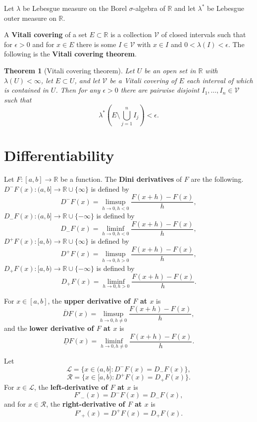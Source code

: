 \documentclass{article}
\newtheorem{theorem}{Theorem}
\theoremstyle{definition}
\begin{document}
Let
$\lambda$ be Lebesgue measure on the Borel $\sigma$-algebra of $\mathbb{R}$ and
let $\lambda^*$ be Lebesgue outer measure on $\mathbb{R}$.

A \textbf{Vitali covering} of a set $E \subset \mathbb{R}$ is a collection $\mathcal{V}$ 
of  closed intervals such that for $\epsilon>0$ and for $x \in E$ there is some $I \in \mathcal{V}$ 
with $x \in I$ and
$0<\lambda(I)<\epsilon$. The following is the \textbf{Vitali covering theorem}.

\begin{theorem}[Vitali covering theorem]
Let $U$ be an open set in $\mathbb{R}$ with $\lambda(U)<\infty$, let
$E \subset U$, and let $\mathcal{V}$ be a Vitali covering of $E$ each interval of which is contained in $U$. Then for any $\epsilon>0$ there
are pairwise disjoint $I_1,\ldots,I_n \in \mathcal{V}$ such that 
\[
\lambda^*\left(E \setminus \bigcup_{j=1}^n I_j \right)< \epsilon.
\]
\end{theorem}









\section{Differentiability}
Let $F:[a,b]  \to \mathbb{R}$ be a function.
The \textbf{Dini derivatives} of $F$ are the following. 
 $D^- F(x):(a,b] \to \mathbb{R} \cup \{\infty\}$ is defined by
\[
D^-F(x) = \limsup_{h \to 0, h<0} \frac{F(x+h)-F(x)}{h},
\]
 $D_-F(x):(a,b] \to \mathbb{R} \cup \{-\infty\}$ is defined by
\[
D_-F(x) = \liminf_{h \to 0, h<0} \frac{F(x+h)-F(x)}{h},
\]
$D^+F(x):[a,b) \to \mathbb{R} \cup \{\infty\}$ is defined by
\[
D^+F(x) = \limsup_{h \to 0, h>0}  \frac{F(x+h)-F(x)}{h},
\]
$D_+F(x):[a,b) \to \mathbb{R} \cup \{-\infty\}$ is defined by
\[
D_+F(x) = \liminf_{h \to 0, h>0}\frac{F(x+h)-F(x)}{h}.
\]


For $x \in [a,b]$, the \textbf{upper derivative of $F$ at $x$} is
\[
\overline{D}F(x) = \limsup_{h \to 0, h \neq 0} \frac{F(x+h)-F(x)}{h},
\]
and  the \textbf{lower derivative of $F$ at $x$} is 
\[
\underline{D}F(x) = \liminf_{h \to 0, h \neq 0} \frac{F(x+h)-F(x)}{h}.
\]


Let
\[
\mathscr{L}=\{x \in (a,b]: D^-F(x)=D_-F(x)\},
\]
\[
\mathscr{R}=\{x \in [a,b): D^+F(x)=D_+F(x)\}.
\]
For $x \in \mathscr{L}$, the \textbf{left-derivative of $F$ at $x$} is
\[
F'_-(x)=D^-F(x)=D_-F(x),
\]
and for $x \in \mathscr{R}$, the  \textbf{right-derivative of $F$ at $x$} is
\[
F'_+(x)=D^+F(x)=D_+F(x).
\]
\end{document}
